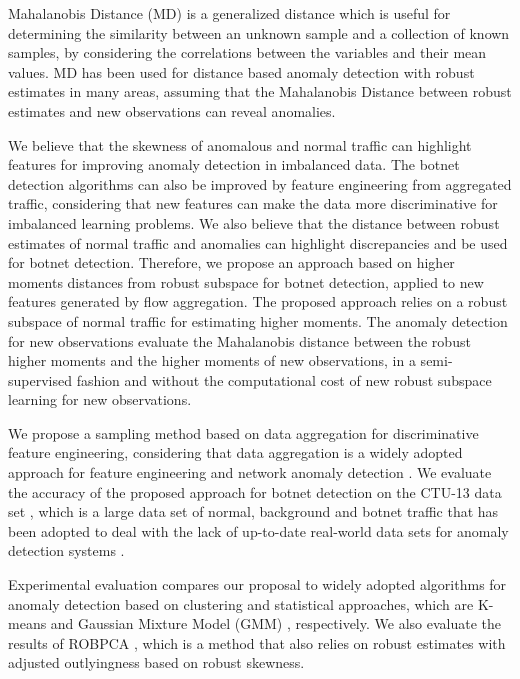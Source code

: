 \documentclass[review]{elsarticle}
\begin{document}
Mahalanobis Distance (MD) is a generalized distance which is useful for determining the similarity between an unknown sample and a collection of known samples, by considering the correlations between the variables and their mean values. MD has been used for distance based anomaly detection with robust estimates in many areas, assuming that the Mahalanobis Distance between robust estimates and new observations can reveal anomalies.

We believe that the skewness of anomalous and normal traffic can highlight features for improving anomaly detection in imbalanced data. The botnet detection algorithms can also be improved by feature engineering from aggregated traffic, considering that new features can make the data more discriminative for imbalanced learning problems. We also believe that the distance between robust estimates of normal traffic and anomalies can highlight discrepancies and be used for botnet detection. Therefore, we propose an approach based on higher moments distances from robust subspace for botnet detection, applied to new features generated by flow aggregation. The proposed approach relies on a robust subspace of normal traffic for estimating higher moments. The anomaly detection for new observations evaluate the Mahalanobis distance between the robust higher moments and the higher moments of new observations, in a semi-supervised fashion and without the computational cost of new robust subspace learning for new observations.

We propose a sampling method based on data aggregation for discriminative feature engineering, considering that data aggregation is a widely adopted approach for feature engineering \cite{garcia2014empirical, chandrashekar2014survey,acarali2016survey} and network anomaly detection \cite{lakhina2005mining, callegari2011novel, vieira2017model}. We evaluate the accuracy of the proposed approach for botnet detection on the CTU-13 data set \cite{garcia2014empirical}, which is a large data set of normal, background and botnet traffic that has been adopted to deal with the lack of up-to-date real-world data sets for anomaly detection systems \cite{osanaiye2016distributed}.

Experimental evaluation compares our proposal to widely adopted algorithms for anomaly detection based on clustering and statistical approaches, which are K-means and Gaussian Mixture Model (GMM) \cite{gaddam2007kmeans,moustafa2019holistic}, respectively. We also evaluate the results of ROBPCA \cite{hubert2005robpca}, which is a method that also relies on robust estimates with adjusted outlyingness based on robust skewness.
\end{document}
